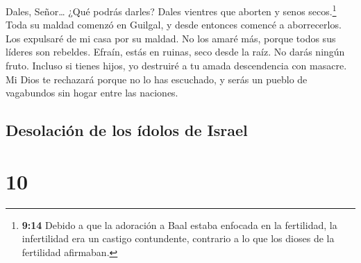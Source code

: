  Dales, Señor\ldots{} ¿Qué podrás darles? Dales vientres
que aborten y senos secos.\footnote{\textbf{9:14} Debido a que la
  adoración a Baal estaba enfocada en la fertilidad, la infertilidad era
  un castigo contundente, contrario a lo que los dioses de la fertilidad
  afirmaban.}  Toda su maldad comenzó en Guilgal, y desde
entonces comencé a aborrecerlos. Los expulsaré de mi casa por su maldad.
No los amaré más, porque todos sus líderes son rebeldes. 
Efraín, estás en ruinas, seco desde la raíz. No darás ningún fruto.
Incluso si tienes hijos, yo destruiré a tu amada descendencia con
masacre.  Mi Dios te rechazará porque no lo has
escuchado, y serás un pueblo de vagabundos sin hogar entre las naciones.

\hypertarget{desolaciuxf3n-de-los-uxeddolos-de-israel}{%
\subsection{Desolación de los ídolos de
Israel}\label{desolaciuxf3n-de-los-uxeddolos-de-israel}}

\hypertarget{section-9}{%
\section{10}\label{section-9}}

